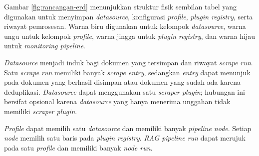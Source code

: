 Gambar \ref{fig:rancangan-erd} menunjukkan struktur fisik sembilan tabel yang digunakan untuk menyimpan \textit{datasource}, konfigurasi \textit{profile}, \textit{plugin registry}, serta riwayat pemrosesan.
Warna biru digunakan untuk kelompok \textit{datasource}, warna ungu untuk kelompok \textit{profile}, warna jingga untuk \textit{plugin registry}, dan warna hijau untuk \textit{monitoring pipeline}.

\textit{Datasource} menjadi induk bagi dokumen yang tersimpan dan riwayat \textit{scrape run}.
Satu \textit{scrape run} memiliki banyak \textit{scrape entry}, sedangkan \textit{entry} dapat menunjuk pada dokumen yang berhasil disimpan atau dokumen yang sudah ada karena deduplikasi.
\textit{Datasource} dapat menggunakan satu \textit{scraper plugin}; hubungan ini bersifat opsional karena \textit{datasource} yang hanya menerima unggahan tidak memiliki \textit{scraper plugin}.

\textit{Profile} dapat memilih satu \textit{datasource} dan memiliki banyak \textit{pipeline node}.
Setiap \textit{node} memilih satu baris pada \textit{plugin registry}.
\textit{RAG pipeline run} dapat merujuk pada satu \textit{profile} dan memiliki banyak \textit{node run}.

\begingroup
\scriptsize
\setlength{\tabcolsep}{2pt}


